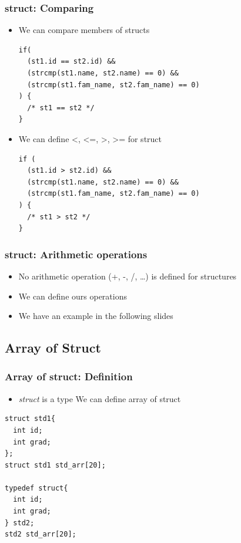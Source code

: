 \documentclass{../c-lecture}
\begin{document}
\begin{frame}[fragile]
  \frametitle{struct: Comparing}
  \begin{itemize}
    \item We can compare members of structs
    \scriptsize
    \begin{verbatim}
if(
  (st1.id == st2.id) &&
  (strcmp(st1.name, st2.name) == 0) &&
  (strcmp(st1.fam_name, st2.fam_name) == 0)
) {
  /* st1 == st2 */
}
    \end{verbatim}
    \normalsize
    \item We can define <, <=, >, >= for struct
    \scriptsize
    \begin{verbatim}
if (
  (st1.id > st2.id) &&
  (strcmp(st1.name, st2.name) == 0) &&
  (strcmp(st1.fam_name, st2.fam_name) == 0)
) {
  /* st1 > st2 */
}
    \end{verbatim}
  \end{itemize}
\end{frame}

\begin{frame}
  \frametitle{struct: Arithmetic operations}
  \begin{itemize}
    \item No arithmetic operation (+, -, /, \ldots) is defined for structures
    \item We can define ours operations
    \item We have an example in the following slides
  \end{itemize}
\end{frame}

\subsection{Array of Struct}

\begin{frame}[fragile]
  \frametitle{Array of struct: Definition}
  \begin{itemize}
    \item
      \textit{\color{Cyan} struct} is a type \textrightarrow We can define array
      of struct
  \end{itemize}
  \scriptsize
  \begin{verbatim}
struct std1{
  int id;
  int grad;
};
struct std1 std_arr[20];

typedef struct{
  int id;
  int grad;
} std2;
std2 std_arr[20];
  \end{verbatim}
\end{frame}
\end{document}
